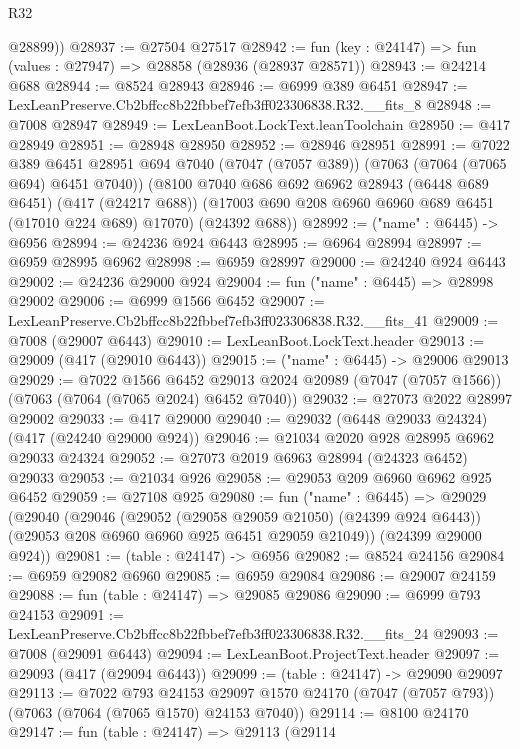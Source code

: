 \begin{lexlean}{R32}
\begin{coremodule}
        @28899))
@28937 := @27504 @27517
@28942 := fun (key : @24147) => fun (values : @27947) => @28858 (@28936 (@28937 @28571))
@28943 := @24214 @688
@28944 := @8524 @28943
@28946 := @6999 @389 @6451
@28947 := LexLeanPreserve.Cb2bffcc8b22fbbef7efb3ff023306838.R32.__fits_8
@28948 := @7008 @28947
@28949 := LexLeanBoot.LockText.leanToolchain
@28950 := @417 @28949
@28951 := @28948 @28950
@28952 := @28946 @28951
@28991 := @7022
    @389
    @6451
    @28951
    @694
    @7040
    (@7047 (@7057 @389))
    (@7063 (@7064 (@7065 @694) @6451 @7040))
    (@8100
      @7040
      @686
      @692
      @6962
      @28943
      (@6448 @689 @6451)
      (@417 (@24217 @688))
      (@17003 @690 @208 @6960 @6960 @689 @6451 (@17010 @224 @689) @17070)
      (@24392 @688))
@28992 := ("name" : @6445) -> @6956
@28994 := @24236 @924 @6443
@28995 := @6964 @28994
@28997 := @6959 @28995 @6962
@28998 := @6959 @28997
@29000 := @24240 @924 @6443
@29002 := @24236 @29000 @924
@29004 := fun ("name" : @6445) => @28998 @29002
@29006 := @6999 @1566 @6452
@29007 := LexLeanPreserve.Cb2bffcc8b22fbbef7efb3ff023306838.R32.__fits_41
@29009 := @7008 (@29007 @6443)
@29010 := LexLeanBoot.LockText.header
@29013 := @29009 (@417 (@29010 @6443))
@29015 := ("name" : @6445) -> @29006 @29013
@29029 := @7022
    @1566
    @6452
    @29013
    @2024
    @20989
    (@7047 (@7057 @1566))
    (@7063 (@7064 (@7065 @2024) @6452 @7040))
@29032 := @27073 @2022 @28997 @29002
@29033 := @417 @29000
@29040 := @29032 (@6448 @29033 @24324) (@417 (@24240 @29000 @924))
@29046 := @21034 @2020 @928 @28995 @6962 @29033 @24324
@29052 := @27073 @2019 @6963 @28994 (@24323 @6452) @29033
@29053 := @21034 @926
@29058 := @29053 @209 @6960 @6962 @925 @6452
@29059 := @27108 @925
@29080 := fun ("name" : @6445) =>
  @29029
    (@29040
      (@29046
        (@29052 (@29058 @29059 @21050) (@24399 @924 @6443))
        (@29053 @208 @6960 @6960 @925 @6451 @29059 @21049))
      (@24399 @29000 @924))
@29081 := (table : @24147) -> @6956
@29082 := @8524 @24156
@29084 := @6959 @29082 @6960
@29085 := @6959 @29084
@29086 := @29007 @24159
@29088 := fun (table : @24147) => @29085 @29086
@29090 := @6999 @793 @24153
@29091 := LexLeanPreserve.Cb2bffcc8b22fbbef7efb3ff023306838.R32.__fits_24
@29093 := @7008 (@29091 @6443)
@29094 := LexLeanBoot.ProjectText.header
@29097 := @29093 (@417 (@29094 @6443))
@29099 := (table : @24147) -> @29090 @29097
@29113 := @7022
    @793
    @24153
    @29097
    @1570
    @24170
    (@7047 (@7057 @793))
    (@7063 (@7064 (@7065 @1570) @24153 @7040))
@29114 := @8100 @24170
@29147 := fun (table : @24147) =>
  @29113
    (@29114

\end{coremodule}
\end{lexlean}
